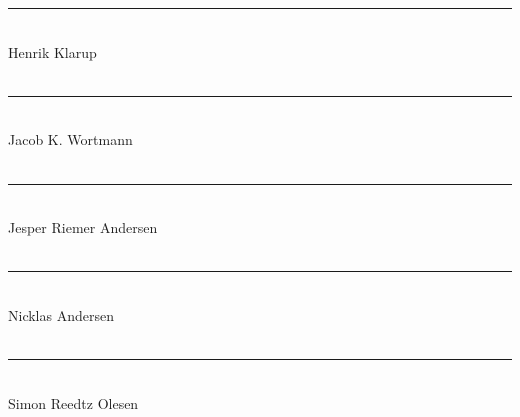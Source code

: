 \setcounter{page}{5}
\thispagestyle{empty}

\noindent\rule{8cm}{0.03cm}\\
Henrik Klarup\\\\

\noindent\rule{8cm}{0.03cm}\\
Jacob K. Wortmann\\\\

\noindent\rule{8cm}{0.03cm}\\ 
Jesper Riemer Andersen\\ \\

\noindent\rule{8cm}{0.03cm}\\
Nicklas Andersen\\\\

\noindent\rule{8cm}{0.03cm}\\
Simon Reedtz Olesen\\\\
